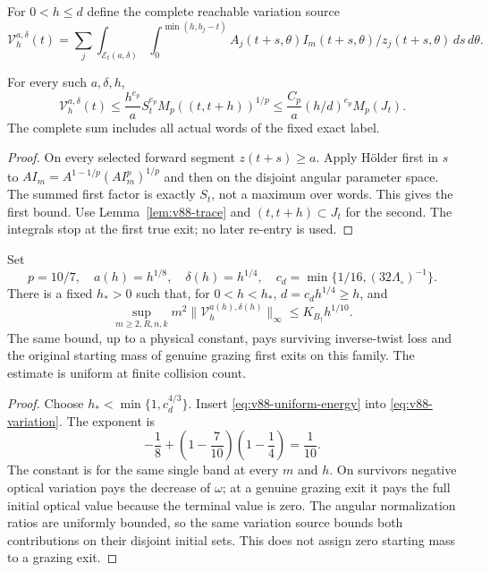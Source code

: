 For $0<h\le d$ define the complete reachable variation source
\[
 \mathcal V_h^{a,\delta}(t)=\sum_j\int_{\mathcal E_t(a,\delta)}
    \int_0^{\min(h,b_j-t)}
       A_j(t+s,\theta)I_m(t+s,\theta)/z_j(t+s,\theta)
                                                     \,ds\,d\theta.
\]
\begin{theorem}
\label{thm:v88-variation}
For every such $a,\delta,h$,
\begin{equation}\label{eq:v88-variation}
 \mathcal V_h^{a,\delta}(t)
 \le \frac{h^{e_p}}a S_t^{e_p}M_p((t,t+h))^{1/p}
 \le \frac{C_p}a(h/d)^{e_p}M_p(J_t).
\end{equation}
The complete sum includes all actual words of the fixed exact label.
\end{theorem}
\begin{proof}
On every selected forward segment $z(t+s)\ge a$. Apply H\"older
first in $s$ to $AI_m=A^{1-1/p}(AI_m^p)^{1/p}$ and then on the
disjoint angular parameter space. The summed first factor is exactly
$S_t$, not a maximum over words. This gives the first bound. Use
Lemma~\ref{lem:v88-trace} and $(t,t+h)\subset J_t$ for the second.
The integrals stop at the first true exit; no later re-entry is used.
\end{proof}

\begin{theorem}
\label{thm:v88-expanded}
Set
\[
 p=10/7,\quad a(h)=h^{1/8},\quad\delta(h)=h^{1/4},\quad
 c_d=\min\{1/16,(32\Lambda_\circ)^{-1}\}.
\]
There is a fixed $h_*>0$ such that, for $0<h<h_*$,
$d=c_dh^{1/4}\ge h$, and
\begin{equation}\label{eq:v88-expanded}
 \sup_{m\ge2,R,n,k}m^2\|\mathcal V_h^{a(h),\delta(h)}\|_\infty
                              \le K_{B_\dagger}h^{1/10}.
\end{equation}
The same bound, up to a physical constant, pays surviving inverse-twist
loss and the original starting mass of genuine grazing first exits
on this family. The estimate is uniform at finite collision count.
\end{theorem}
\begin{proof}
Choose $h_*<\min\{1,c_d^{4/3}\}$. Insert
\eqref{eq:v88-uniform-energy} into \eqref{eq:v88-variation}.
The exponent is
\[
 -\frac18+\left(1-\frac7{10}\right)\left(1-\frac14\right)
                       =\frac1{10}.
\]
The constant is for the same single band at every $m$ and $h$.
On survivors negative optical variation pays the decrease of $\omega$;
at a genuine grazing exit it pays the full initial optical value
because the terminal value is zero. The angular normalization ratios
are uniformly bounded, so the same variation source bounds both
contributions on their disjoint initial sets. This does not assign
zero starting mass to a grazing exit.
\end{proof}

